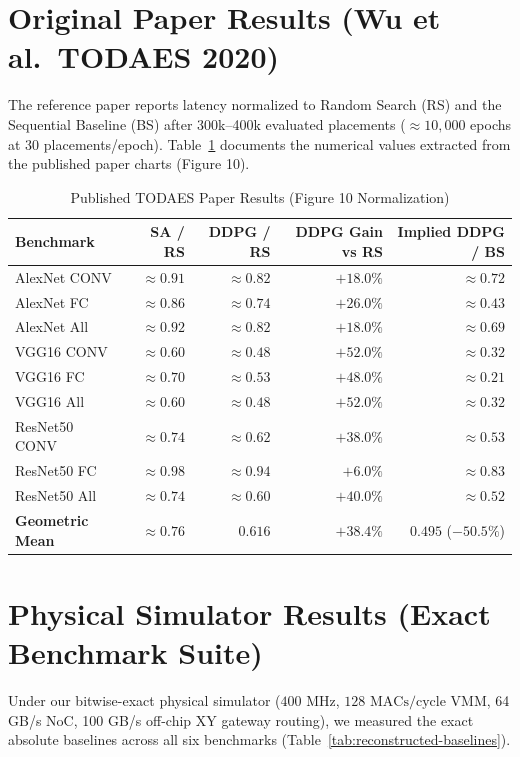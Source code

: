 \documentclass[10pt,conference]{IEEEtran}
\begin{document}
\section{Original Paper Results (Wu et al.\ TODAES 2020)}
The reference paper reports latency normalized to Random Search (RS) and the Sequential Baseline (BS) after 300k--400k evaluated placements ($\approx 10,000$ epochs at 30 placements/epoch). Table~\ref{tab:paper-published} documents the numerical values extracted from the published paper charts (Figure 10).

\begin{table}[htbp]
  \caption{Published TODAES Paper Results (Figure 10 Normalization)}
  \label{tab:paper-published}
  \centering
  \small
  \begin{tabular}{lrrrr}
    \toprule
    Benchmark & SA / RS & DDPG / RS & DDPG Gain vs RS & Implied DDPG / BS \\
    \midrule
    AlexNet CONV & $\approx 0.91$ & $\approx 0.82$ & $+18.0\%$ & $\approx 0.72$ \\
    AlexNet FC   & $\approx 0.86$ & $\approx 0.74$ & $+26.0\%$ & $\approx 0.43$ \\
    AlexNet All  & $\approx 0.92$ & $\approx 0.82$ & $+18.0\%$ & $\approx 0.69$ \\
    \midrule
    VGG16 CONV   & $\approx 0.60$ & $\approx 0.48$ & $+52.0\%$ & $\approx 0.32$ \\
    VGG16 FC     & $\approx 0.70$ & $\approx 0.53$ & $+48.0\%$ & $\approx 0.21$ \\
    VGG16 All    & $\approx 0.60$ & $\approx 0.48$ & $+52.0\%$ & $\approx 0.32$ \\
    \midrule
    ResNet50 CONV& $\approx 0.74$ & $\approx 0.62$ & $+38.0\%$ & $\approx 0.53$ \\
    ResNet50 FC  & $\approx 0.98$ & $\approx 0.94$ & $+6.0\%$  & $\approx 0.83$ \\
    ResNet50 All & $\approx 0.74$ & $\approx 0.60$ & $+40.0\%$ & $\approx 0.52$ \\
    \midrule
    \textbf{Geometric Mean} & $\approx \mathbf{0.76}$ & $\mathbf{0.616}$ & $\mathbf{+38.4\%}$ & $\mathbf{0.495}$ ($-50.5\%$) \\
    \bottomrule
  \end{tabular}
\end{table}

\section{Physical Simulator Results (Exact Benchmark Suite)}
Under our bitwise-exact physical simulator ($400\text{ MHz}$, $128\text{ MACs/cycle}$ VMM, 64 GB/s NoC, 100 GB/s off-chip XY gateway routing), we measured the exact absolute baselines across all six benchmarks (Table~\ref{tab:reconstructed-baselines}).
\end{document}
